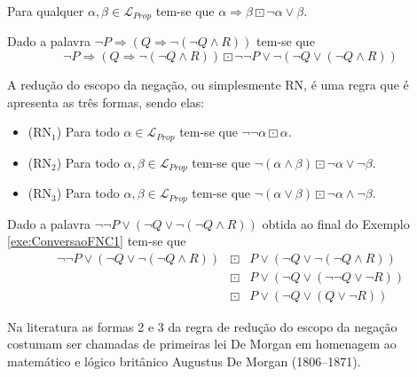 \begin{definition}\label{Def:ConversaoImplicacao}
    Para qualquer $\alpha, \beta \in \mathcal{L}_{Prop}$ tem-se que $\alpha \Rightarrow \beta \boxdot \neg \alpha \lor \beta$.
\end{definition}

\begin{exem}\label{exe:ConversaoFNC1}
    Dado a palavra $\neg P \Rightarrow (Q \Rightarrow \neg (\neg Q \land R))$ tem-se que 
    $$\neg P \Rightarrow (Q \Rightarrow \neg (\neg Q \land R)) \boxdot \neg \neg P \lor \neg (\neg Q \lor (\neg Q \land R))$$
\end{exem}

\begin{definition}
    A redução do escopo da negação, ou simplesmente RN, é uma regra que é apresenta as três formas, sendo elas:
    \begin{itemize}
        \item[ ] (RN$_1$) Para todo $\alpha \in \mathcal{L}_{Prop}$ tem-se que $\neg \neg \alpha \boxdot \alpha$.
        \item[ ] (RN$_2$) Para todo $\alpha, \beta \in \mathcal{L}_{Prop}$ tem-se que $\neg(\alpha \land \beta) \boxdot \neg \alpha \lor \neg \beta$.
        \item[ ] (RN$_3$) Para todo $\alpha, \beta \in \mathcal{L}_{Prop}$ tem-se que $\neg(\alpha \lor \beta) \boxdot \neg \alpha \land \neg \beta$.
    \end{itemize}
\end{definition}

\begin{exem}
    Dado a palavra $\neg \neg P \lor (\neg Q \lor \neg (\neg Q \land R))$ obtida ao final do Exemplo \ref{exe:ConversaoFNC1} tem-se que
    \begin{eqnarray*}
        \neg \neg P \lor (\neg Q \lor \neg (\neg Q \land R)) & \boxdot & P \lor (\neg Q \lor \neg (\neg Q \land R))\\
        & \boxdot & P \lor (\neg Q \lor (\neg\neg Q \lor \neg R))\\
        & \boxdot & P \lor (\neg Q \lor (Q \lor \neg R))
    \end{eqnarray*}
\end{exem}

\begin{rema}
    Na literatura as formas 2 e 3 da regra de redução do escopo da negação costumam ser chamadas de primeiras lei De Morgan em homenagem ao matemático e lógico britânico Augustus De Morgan (1806--1871).
\end{rema}


